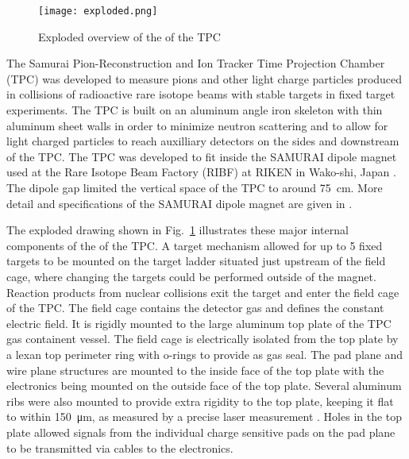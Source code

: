 \begin{figure}[!htb]
\texttt{[image: exploded.png]}
\caption{Exploded overview of the of the \spirit TPC}
\label{fig:tpcExplode}
\end{figure}


The Samurai Pion-Reconstruction and Ion Tracker Time Projection Chamber (\spirit TPC) was developed to measure pions and other light charge particles produced in collisions of radioactive rare isotope beams with stable targets in fixed target experiments.  The TPC is built on an aluminum angle iron skeleton with thin aluminum sheet walls in order to minimize neutron scattering and to allow for light charged particles to reach auxilliary detectors on the sides and downstream of the TPC. The \spirit TPC was developed to fit inside the SAMURAI dipole magnet used at the Rare Isotope Beam Factory (RIBF) at RIKEN in Wako-shi, Japan \cite{riken}. The dipole gap limited the vertical space of the TPC to around \SI{75}{\centi\metre}. More detail and specifications of the SAMURAI dipole magnet are given in \cite{samurai}. 

The exploded drawing shown in Fig.~\ref{fig:tpcExplode} illustrates these major internal components of the  of the \spirit TPC. A target mechanism allowed for up to 5 fixed targets to be mounted on the target ladder situated just upstream of the field cage, where changing the targets could be performed outside of the magnet. Reaction products from nuclear collisions exit the target and enter the field cage of the TPC. The field cage contains the detector gas and defines the constant electric field. It is rigidly mounted to the large aluminum top plate of the TPC gas containent vessel. The field cage is electrically isolated from the top plate by a lexan top perimeter ring with o-rings to provide as gas seal. The pad plane and wire plane structures are  mounted to the inside face of the top plate with the electronics being mounted on the outside face of the top plate. Several aluminum ribs were also mounted to provide extra rigidity to the top plate, keeping it flat to within \SI{150}{\micro\metre}, as measured by a precise laser measurement \cite{jon}. Holes in the top plate allowed signals from the individual charge sensitive pads on the pad plane to be transmitted via cables to the electronics. 




